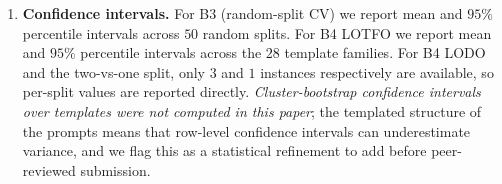 \begin{enumerate}
        from ridge regression, variance removed is $1 - \|X - \hat{X}\|_F^2 /
        \|X - \bar{X}\|_F^2$. This is the multi-output coefficient
        of determination $R^2$ summed across hidden dimensions. Negative
        values are possible and observed (Study B4 LODO); they
        indicate the regression makes worse-than-mean predictions,
        which we read as evidence the lexical regression has
        failed to generalize to the held-out group.
    \item \textbf{Confidence intervals.} For B3 (random-split CV)
        we report mean and $95\%$ percentile intervals across $50$
        random splits. For B4 LOTFO we report mean and $95\%$
        percentile intervals across the $28$ template families. For
        B4 LODO and the two-vs-one split, only $3$ and $1$ instances
        respectively are available, so per-split values are reported
        directly. \emph{Cluster-bootstrap confidence intervals over
        templates were not computed in this paper}; the templated
        structure of the prompts means that row-level confidence
        intervals can underestimate variance, and we flag this as a
        statistical refinement to add before peer-reviewed
        submission.
\end{enumerate}
